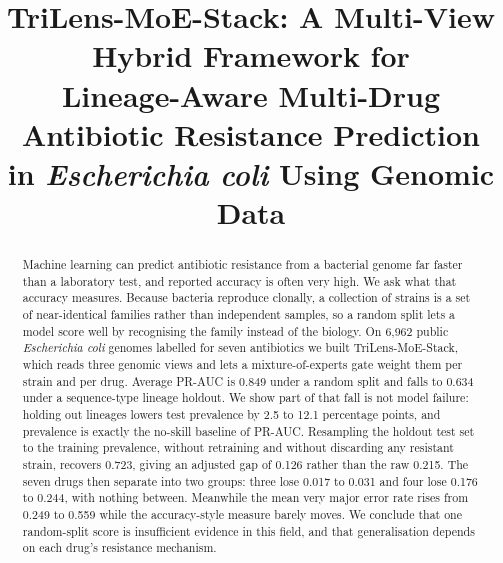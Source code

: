 \documentclass[conference]{IEEEtran}
\begin{document}
\title{TriLens-MoE-Stack: A Multi-View Hybrid Framework for\\
Lineage-Aware Multi-Drug Antibiotic Resistance Prediction\\
in \textit{Escherichia coli} Using Genomic Data}

\author{%
}

\maketitle

\begin{abstract}
Machine learning can predict antibiotic resistance from a bacterial genome far
faster than a laboratory test, and reported accuracy is often very high. We ask
what that accuracy measures. Because bacteria reproduce clonally, a collection of
strains is a set of near-identical families rather than independent samples, so a
random split lets a model score well by recognising the family instead of the
biology. On 6{,}962 public \textit{Escherichia coli} genomes labelled for seven
antibiotics we built TriLens-MoE-Stack, which reads three genomic views and lets a
mixture-of-experts gate weight them per strain and per drug. Average PR-AUC is
0.849 under a random split and falls to 0.634 under a sequence-type lineage
holdout. We show part of that fall is not model failure: holding out lineages
lowers test prevalence by 2.5 to 12.1 percentage points, and prevalence is exactly
the no-skill baseline of PR-AUC. Resampling the holdout test set to the training
prevalence, without retraining and without discarding any resistant strain,
recovers 0.723, giving an adjusted gap of 0.126 rather than the raw 0.215. The
seven drugs then separate into two groups: three lose 0.017 to 0.031 and four lose
0.176 to 0.244, with nothing between. Meanwhile the mean very major error rate
rises from 0.249 to 0.559 while the accuracy-style measure barely moves. We
conclude that one random-split score is insufficient evidence in this field, and
that generalisation depends on each drug's resistance mechanism.
\end{abstract}
\end{document}
